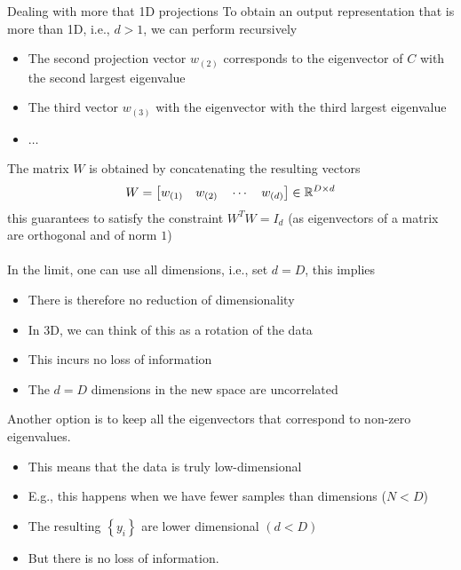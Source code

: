\begin{parag}{Dealing with more that 1D projections}
    To obtain an output representation that is more than 1D, i.e., $d > 1$, we can perform recursively 
	\begin{itemize}
	    \item The second projection vector $w_{\left(2\right)}$ corresponds to the eigenvector of $C$ with the second largest eigenvalue
	    \item The third vector $w_{\left(3\right)}$ with the eigenvector with the third largest eigenvalue
	    \item $\ldots$
	\end{itemize}
	The matrix $W$ is obtained by concatenating the resulting vectors 
	\begin{align*} 
		W =  \left[w_{\left(1\right)} \mathspace w_{\left(2\right)} \mathspace \cdots \mathspace w_{\left(d\right)}\right] \in \mathbb{R}^{D \times d}
	\end{align*}
	this guarantees to satisfy the constraint $W^{T}W =  I_d$ (as eigenvectors of a matrix are orthogonal and of norm $1$)\\
	$ $\\
	In the limit, one can use all dimensions, i.e., set $d = D$, this implies
	\begin{itemize}
	    \item There is therefore no reduction of dimensionality
	    \item In 3D, we can think of this as a rotation of the data
	    \item This incurs no loss of information
	    \item The $d =  D$ dimensions in the new space are uncorrelated
	\end{itemize}
	Another option is to keep all the eigenvectors that correspond to non-zero eigenvalues.
	\begin{itemize}
	    \item This means that the data is truly low-dimensional
	    \item E.g., this happens when we have fewer samples than dimensions ($N < D$)
	    \item The resulting $\left\{y_i\right\}$ are lower dimensional $\left(d < D\right)$
	    \item But there is no loss of information.
	\end{itemize}
	
	
\end{parag}

